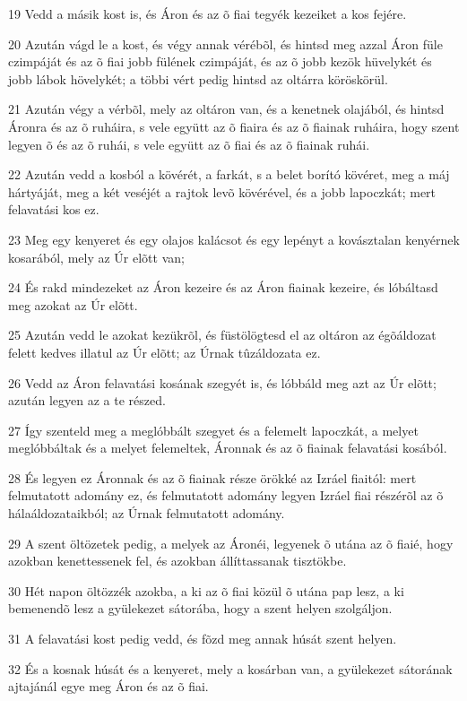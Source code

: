 \par 19 Vedd a másik kost is, és Áron és az õ fiai tegyék kezeiket a kos fejére.
\par 20 Azután vágd le a kost, és végy annak vérébõl, és hintsd meg azzal Áron füle czimpáját és az õ fiai jobb fülének czimpáját, és az õ jobb kezök hüvelykét és jobb lábok hövelykét; a többi vért pedig hintsd az oltárra köröskörül.
\par 21 Azután végy a vérbõl, mely az oltáron van, és a kenetnek olajából, és hintsd Áronra és az õ ruháira, s vele együtt az õ fiaira és az õ fiainak ruháira, hogy szent legyen õ és az õ ruhái, s vele együtt az õ fiai és az õ fiainak ruhái.
\par 22 Azután vedd a kosból a kövérét, a farkát, s a belet borító kövéret, meg a máj hártyáját, meg a két veséjét a rajtok levõ kövérével, és a jobb lapoczkát; mert felavatási kos ez.
\par 23 Meg egy kenyeret és egy olajos kalácsot és egy lepényt a kovásztalan kenyérnek kosarából, mely az Úr elõtt van;
\par 24 És rakd mindezeket az Áron kezeire és az Áron fiainak kezeire, és lóbáltasd meg azokat az Úr elõtt.
\par 25 Azután vedd le azokat kezükrõl, és füstölögtesd el az oltáron az égõáldozat felett kedves illatul az Úr elõtt; az Úrnak tûzáldozata ez.
\par 26 Vedd az Áron felavatási kosának szegyét is, és lóbbáld meg azt az Úr elõtt; azután legyen az a te részed.
\par 27 Így szenteld meg a meglóbbált szegyet és a felemelt lapoczkát, a melyet meglóbbáltak és a melyet felemeltek, Áronnak és az õ fiainak felavatási kosából.
\par 28 És legyen ez Áronnak és az õ fiainak része örökké az Izráel fiaitól: mert felmutatott adomány ez, és felmutatott adomány legyen Izráel fiai részérõl az õ hálaáldozataikból; az Úrnak felmutatott adomány.
\par 29 A szent öltözetek pedig, a melyek az Áronéi, legyenek õ utána az õ fiaié, hogy azokban kenettessenek fel, és azokban állíttassanak tisztökbe.
\par 30 Hét napon öltözzék azokba, a ki az õ fiai közül õ utána pap lesz, a ki bemenendõ lesz a gyülekezet sátorába, hogy a szent helyen szolgáljon.
\par 31 A felavatási kost pedig vedd, és fõzd meg annak húsát szent helyen.
\par 32 És a kosnak húsát és a kenyeret, mely a kosárban van, a gyülekezet sátorának ajtajánál egye meg Áron és az õ fiai.
